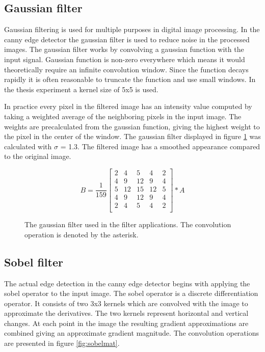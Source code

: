 \subsection{Gaussian filter}
\label{subsec:gauss}
Gaussian filtering is used for multiple purposes in digital image processing. In the canny edge detector the gaussian filter is used to reduce noise in the processed images. The gaussian filter works by convolving a gaussian function with the input signal. Gaussian function is non-zero everywhere which means it would theoretically require an infinite convolution window. Since the function decays rapidly it is often reasonable to truncate the function and use small windows. \cite{gonzalez2008digital} In the thesis experiment a kernel size of 5x5 is used.

In practice every pixel in the filtered image has an intensity value computed by taking a weighted average of the neighboring pixels in the input image. The weights are precalculated from the gaussian function, giving the highest weight to the pixel in the center of the window. The gaussian filter displayed in figure \ref{fig:gaussmat} was calculated with $\sigma$ = 1.3. The filtered image has a smoothed appearance compared to the original image. 

\begin{figure}
    \begin{displaymath}
        B = \frac{1}{159}\begin{bmatrix}
             2 & 4 & 5 & 4 & 2 \\
             4 & 9 & 12 & 9 & 4 \\
             5 & 12 & 15 & 12 & 5 \\
             4 & 9 & 12 & 9 & 4 \\
             2 & 4 & 5 & 4 & 2 \\
        \end{bmatrix} \ast A
    \end{displaymath}
    \caption{The gaussian filter used in the filter applications. The convolution operation is denoted by the asterisk.}
    \label{fig:gaussmat}
\end{figure}

\subsection{Sobel filter}
\label{subsec:sobel}
The actual edge detection in the canny edge detector begins with applying the sobel operator to the input image. The sobel operator is a discrete differentiation operator. It consists of two 3x3 kernels which are convolved with the image to approximate the derivatives. The two kernels represent horizontal and vertical changes. At each point in the image the resulting gradient approximations are combined giving an approximate gradient magnitude. \cite{gonzalez2008digital} The convolution operations are presented in figure \ref{fig:sobelmat}.

